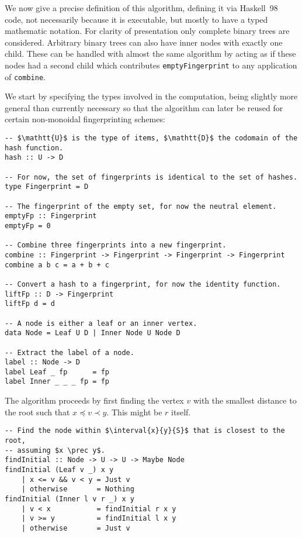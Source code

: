 We now give a precise definition of this algorithm, defining it via Haskell~98~\cite{jones2003haskell} code, not necessarily because it is executable, but mostly to have a typed mathematic notation. For clarity of presentation only complete binary trees are considered. Arbitrary binary trees can also have inner nodes with exactly one child. These can be handled with almost the same algorithm by acting as if these nodes had a second child which contributes \texttt{emptyFingerprint} to any application of \texttt{combine}.

We start by specifying the types involved in the computation, being slightly more general than currently necessary so that the algorithm can later be reused for certain non-monoidal fingerprinting schemes:

\begin{verbatim}
-- $\mathtt{U}$ is the type of items, $\mathtt{D}$ the codomain of the hash function.
hash :: U -> D

-- For now, the set of fingerprints is identical to the set of hashes.
type Fingerprint = D

-- The fingerprint of the empty set, for now the neutral element.
emptyFp :: Fingerprint
emptyFp = 0

-- Combine three fingerprints into a new fingerprint.
combine :: Fingerprint -> Fingerprint -> Fingerprint -> Fingerprint
combine a b c = a + b + c

-- Convert a hash to a fingerprint, for now the identity function.
liftFp :: D -> Fingerprint
liftFp d = d

-- A node is either a leaf or an inner vertex.
data Node = Leaf U D | Inner Node U Node D

-- Extract the label of a node.
label :: Node -> D
label Leaf _ fp      = fp
label Inner _ _ _ fp = fp
\end{verbatim}

The algorithm proceeds by first finding the vertex $v$ with the smallest distance to the root such that $x \preceq v \prec y$. This might be $r$ itself.

\begin{verbatim}
-- Find the node within $\interval{x}{y}{S}$ that is closest to the root,
-- assuming $x \prec y$.
findInitial :: Node -> U -> U -> Maybe Node
findInitial (Leaf v _) x y
    | x <= v && v < y = Just v
    | otherwise       = Nothing
findInitial (Inner l v r _) x y
    | v < x           = findInitial r x y
    | v >= y          = findInitial l x y
    | otherwise       = Just v
\end{verbatim}

